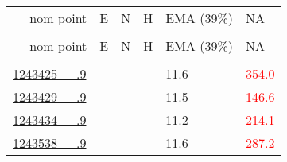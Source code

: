 \documentclass[a4paper, 9pt]{report}
\newenvironment{smalllongtable}{%
    \scriptsize %
    \ttfamily
    \begin{longtable}%
    }{
    \end{longtable}%
    }
\begin{document}
                                   \begin{smalllongtable}[l]{     
                                                           >{\raggedright}m{2.4cm}%
                                                           >{\raggedleft}m{2.4cm}%
                                                           >{\raggedleft}m{2.4cm}%
                                                           >{\raggedleft}m{1.5 cm}%
                                                           >{\raggedleft}m{1.5cm}%
                                                           >{\raggedleft\arraybackslash}m{1.5 cm}}%
                                               
                                                   
                                                               \rowcolors{white} ~~ \normalfont nom point  & \normalfont E & \normalfont N & \normalfont H & \normalfont EMA (39\%) & \normalfont NA \\                       
                                                               \rowcolors{white} & \normalfont [m] & \normalfont [m] & \normalfont [m] & \normalfont [mm] & \normalfont [mm] \\
                                                               \hline
                                                               \endfirsthead
                                                               \rowcolors{white} ~~ \normalfont nom point & \normalfont E & \normalfont N & \normalfont H & \normalfont EMA (39\%) & \normalfont NA \\                       
                                                               \rowcolors{white} & \normalfont [m] & \normalfont [m] & \normalfont [m] & \normalfont [mm] & \normalfont [mm] \\
                                                               \hline
                                                               \endhead
                                                   
                                                               \hyperlink{1243425___.9_Link}{1243425~~~.9} & 2541812.371 & 1152368.783 & 659.940 & \textcolor{green!70!black}{11.6} & \textcolor{red}{354.0} \\\hyperlink{1243429___.9_Link}{1243429~~~.9} & 2540362.775 & 1152039.477 & 549.340 & \textcolor{green!70!black}{11.5} & \textcolor{red}{146.6} \\\hyperlink{1243434___.9_Link}{1243434~~~.9} & 2540385.952 & 1151170.224 & 453.262 & \textcolor{green!70!black}{11.2} & \textcolor{red}{214.1} \\\hyperlink{1243538___.9_Link}{1243538~~~.9} & 2542256.401 & 1150428.148 & 419.680 & \textcolor{green!70!black}{11.6} & \textcolor{red}{287.2} \\
                                   \end{smalllongtable}
\end{document}

